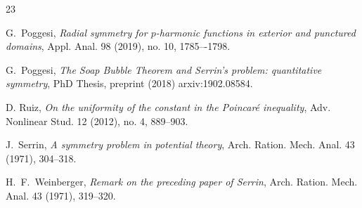 \documentclass[a4paper,10pt]{amsart}
\numberwithin{equation}{section}
\begin{document}
\begin{thebibliography}{23}

 G.~Poggesi, \emph{Radial symmetry for $p$-harmonic functions in exterior and punctured domains},  Appl. Anal. 98 (2019), no. 10, 1785–-1798. 

 G.~Poggesi, \emph{The Soap Bubble Theorem and Serrin’s problem: quantitative symmetry}, PhD Thesis, preprint (2018) arxiv:1902.08584.

 D. Ruiz, \emph{On the uniformity of the constant in the Poincar\'e inequality}, Adv. Nonlinear Stud. 12 (2012), no. 4, 889–903.

 J.~Serrin, \emph{A symmetry problem in potential theory}, Arch. Ration. Mech. Anal. 43 (1971), 304--318.

 H.~F.~Weinberger, \emph{Remark on the preceding paper of Serrin}, Arch. Ration. Mech. Anal. 43 (1971), 319--320.

\end{thebibliography}
\end{document}
